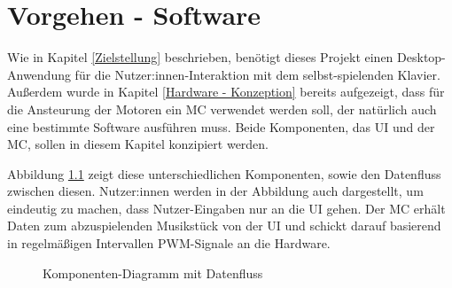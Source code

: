 
\nocite{*}
\chapter{Vorgehen - Software} \label{vorgehenSW}

Wie in Kapitel \ref{Zielstellung} beschrieben, benötigt dieses Projekt einen Desktop-Anwendung für die Nutzer:innen-Interaktion mit dem selbst-spielenden Klavier.
Außerdem wurde in Kapitel \ref{Hardware - Konzeption} bereits aufgezeigt, dass für die Ansteurung der Motoren ein \ac{MC} verwendet werden soll, der natürlich auch eine bestimmte Software ausführen muss.
Beide Komponenten, das \ac{UI} und der \ac{MC}, sollen in diesem Kapitel konzipiert werden.

Abbildung \ref*{fig:high-level-komponenten} zeigt diese unterschiedlichen Komponenten, sowie den Datenfluss zwischen diesen.
Nutzer:innen werden in der Abbildung auch dargestellt, um eindeutig zu machen, dass Nutzer-Eingaben nur an die \ac{UI} gehen.
Der \ac{MC} erhält Daten zum abzuspielenden Musikstück von der \ac{UI} und schickt darauf basierend in regelmäßigen Intervallen \ac{PWM}-Signale an die Hardware.

\begin{figure}[htbp]
    \centering
    \caption{Komponenten-Diagramm mit Datenfluss}
    \label{fig:high-level-komponenten}
\end{figure}

